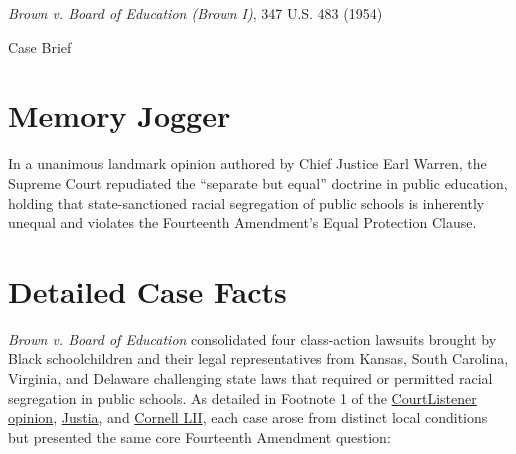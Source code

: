 \documentclass[12pt]{article}
\begin{document}
\begin{center}
{\LARGE \textit{Brown v. Board of Education (Brown I)}, 347 U.S. 483 (1954)\par}
\vspace{0.8em}
{\large Case Brief\par}
\end{center}
\vspace{1em}

\section{Memory Jogger}

In a unanimous landmark opinion authored by Chief Justice Earl Warren, the Supreme Court repudiated the ``separate but equal'' doctrine in public education, holding that state-sanctioned racial segregation of public schools is inherently unequal and violates the Fourteenth Amendment's Equal Protection Clause.

\section{Detailed Case Facts}

\textit{Brown v. Board of Education} consolidated four class-action lawsuits brought by Black schoolchildren and their legal representatives from Kansas, South Carolina, Virginia, and Delaware challenging state laws that required or permitted racial segregation in public schools. As detailed in Footnote 1 of the \href{https://www.courtlistener.com/opinion/105221/brown-v-board-of-education/}{CourtListener opinion}, \href{https://supreme.justia.com/cases/federal/us/347/483/}{Justia}, and \href{https://www.law.cornell.edu/supremecourt/text/347/483/USSC_PRO_347_483_1}{Cornell LII}, each case arose from distinct local conditions but presented the same core Fourteenth Amendment question:
\end{document}

